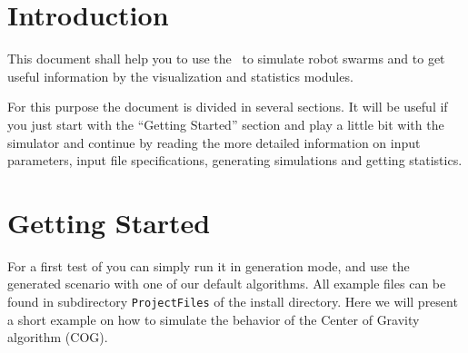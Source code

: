 \section{Introduction}
This document shall help you to use the \RSS\ to simulate robot swarms and to get useful information by the visualization and statistics modules.

For this purpose the document is divided in several sections. It will be useful if you just start with the ``Getting Started'' section and play a little bit with the simulator and continue by reading the more detailed information on input parameters, input file specifications, generating simulations and getting statistics.

\section{Getting Started}
For a first test of \RSS you can simply run it in generation mode, and use the generated scenario with one of our default algorithms. All example files can be found in subdirectory {\tt ProjectFiles} of the install directory. Here we will present a short example on how to simulate the behavior of the {\sffamily Center of Gravity} algorithm (COG).

